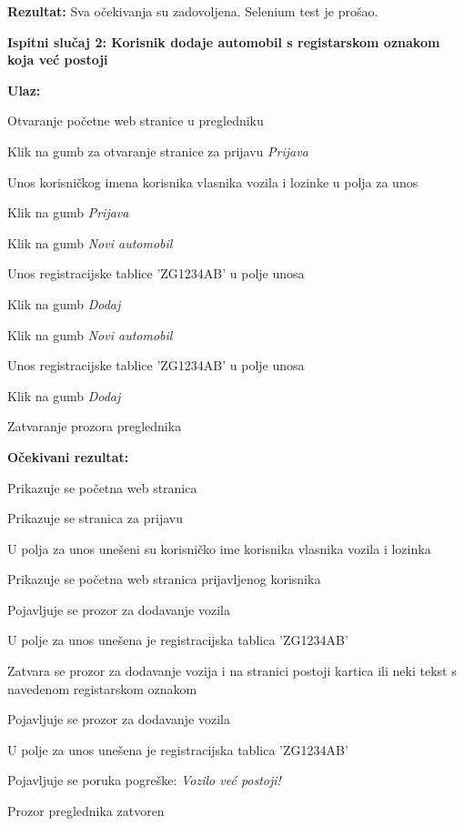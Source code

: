 		
			\noindent\textbf{Rezultat:} Sva očekivanja su zadovoljena. Selenium test je prošao.
			
			\hfill\break
			\noindent\textbf{Ispitni slučaj 2: Korisnik dodaje automobil s registarskom oznakom koja već postoji}
			
			\hfill\break
			\noindent\textbf{Ulaz:}
			
			\begin{packed_enum}
				
				\item Otvaranje početne web stranice u pregledniku
				\item Klik na gumb za otvaranje stranice za prijavu \textit{Prijava}
				\item Unos korisničkog imena korisnika vlasnika vozila i lozinke u polja za unos
				\item Klik na gumb  \textit{Prijava}
				\item Klik na gumb \textit{Novi automobil}
				\item Unos registracijske tablice 'ZG1234AB' u polje unosa
				\item Klik na gumb \textit{Dodaj}
				\item Klik na gumb \textit{Novi automobil}
				\item Unos registracijske tablice 'ZG1234AB' u polje unosa
				\item Klik na gumb \textit{Dodaj}
				\item Zatvaranje prozora preglednika
				
			\end{packed_enum}
			
			\noindent\textbf{Očekivani rezultat:}
			
			\begin{packed_enum}
				
				\item Prikazuje se početna web stranica
				\item Prikazuje se stranica za prijavu
				\item U polja za unos unešeni su korisničko ime korisnika vlasnika vozila i lozinka
				\item Prikazuje se početna web stranica prijavljenog korisnika
				\item Pojavljuje se prozor za dodavanje vozila
				\item U polje za unos unešena je registracijska tablica 'ZG1234AB'
				\item Zatvara se prozor za dodavanje vozija i na stranici postoji kartica ili neki tekst s navedenom registarskom oznakom
				\item Pojavljuje se prozor za dodavanje vozila
				\item U polje za unos unešena je registracijska tablica 'ZG1234AB'
				\item Pojavljuje se poruka pogreške: \textit{Vozilo već postoji!}
				\item Prozor preglednika zatvoren
				
			\end{packed_enum}
			

